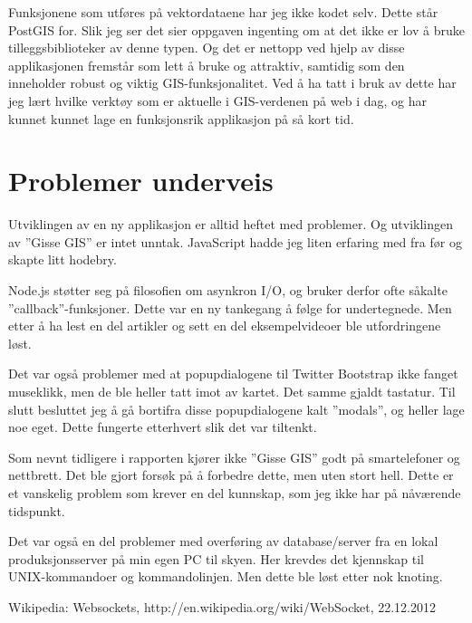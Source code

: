\documentclass[12pt,twoside,onecolumn]{article}
\begin{document}
	Funksjonene som utføres på vektordataene har jeg ikke kodet selv. Dette står PostGIS for. Slik jeg ser det sier oppgaven ingenting om at det ikke er lov å bruke tilleggsbiblioteker av denne typen. Og det er nettopp ved hjelp av disse applikasjonen fremstår som lett å bruke og attraktiv, samtidig som den inneholder robust og viktig GIS-funksjonalitet. Ved å ha tatt i bruk av dette har jeg lært hvilke verktøy som er aktuelle i GIS-verdenen på web i dag, og har kunnet kunnet lage en funksjonsrik applikasjon på så kort tid.

\section{Problemer underveis}

	Utviklingen av en ny applikasjon er alltid heftet med problemer. Og utviklingen av ''Gisse GIS'' er intet unntak. JavaScript hadde jeg liten erfaring med fra før og skapte litt hodebry. 
	
	Node.js støtter seg på filosofien om asynkron I/O, og bruker derfor ofte såkalte ''callback''-funksjoner. Dette var en ny tankegang å følge for undertegnede. Men etter å ha lest en del artikler og sett en del eksempelvideoer ble utfordringene løst.
	
	Det var også problemer med at popupdialogene til Twitter Bootstrap ikke fanget museklikk, men de ble heller tatt imot av kartet. Det samme gjaldt tastatur. Til slutt besluttet jeg å gå bortifra disse popupdialogene kalt ''modals'', og heller lage noe eget. Dette fungerte etterhvert slik det var tiltenkt.
	
	Som nevnt tidligere i rapporten kjører ikke ''Gisse GIS'' godt på smartelefoner og nettbrett. Det ble gjort forsøk på å forbedre dette, men uten stort hell. Dette er et vanskelig problem som krever en del kunnskap, som jeg ikke har på nåværende tidspunkt.
	
	Det var også en del problemer med overføring av database/server fra en lokal produksjonsserver på min egen PC til skyen. Her krevdes det kjennskap til UNIX-kommandoer og kommandolinjen. Men dette ble løst etter nok knoting.    
	

\newpage
\begin{thebibliography}{9}

	Wikipedia: Websockets, http://en.wikipedia.org/wiki/WebSocket, 22.12.2012

\end{thebibliography}

\listoffigures
\end{document}
